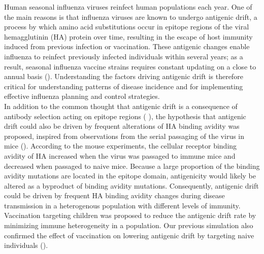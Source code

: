 \documentclass[12pt,a4paper]{article}
\begin{document}
Human seasonal influenza viruses reinfect human populations each year. One of the main reasons is that influenza viruses are known to undergo antigenic drift, a process by which amino acid substitutions occur in epitope regions of the viral hemagglutinin (HA) protein over time, resulting in the escape of host immunity induced from previous infection or vaccination. These antigenic changes enable influenza to reinfect previously infected individuals within several years; as a result, seasonal influenza vaccine strains requires constant updating on a close to annual basis (\cite{Carrat2007}). Understanding the factors driving antigenic drift is therefore critical for understanding patterns of disease incidence and for implementing effective influenza planning and control strategies. \\
In addition to the common thought that antigenic drift is a consequence of antibody selection acting on epitope regions (\cite{Grenfell2004} \cite{Wilson1990}), the hypothesis that antigenic drift could also be driven by frequent alterations of HA binding avidity was proposed, inspired from observations from the serial passaging of the virus in mice (\cite{Hensley2009}). According to the mouse experiments, the cellular receptor binding avidity of HA increased when the virus was passaged to immune mice and decreased when passaged to naive mice. Because a large proportion of the binding avidity mutations are located in the epitope domain, antigenicity would likely be altered as a byproduct of binding avidity mutations. Consequently, antigenic drift could be driven by frequent HA binding avidity changes during disease transmission in a heterogenous population with different levels of immunity. Vaccination targeting children was proposed to reduce the antigenic drift rate by minimizing immune heterogeneity in a population. Our previous simulation also confirmed the effect of vaccination on lowering antigenic drift by targeting naive individuals (\cite{Yuan2013}). \\
\end{document}
